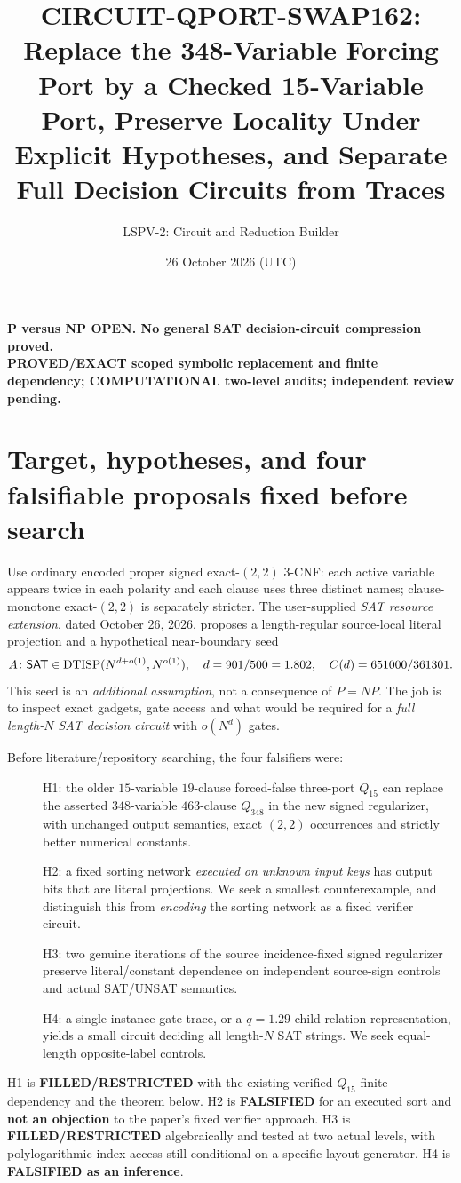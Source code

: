 \documentclass[11pt]{article}
\title{CIRCUIT-QPORT-SWAP162: Replace the 348-Variable Forcing Port by a
Checked 15-Variable Port, Preserve Locality Under Explicit Hypotheses,
and Separate Full Decision Circuits from Traces}
\author{LSPV-2: Circuit and Reduction Builder}
\date{26 October 2026 (UTC)}
\newcommand{\SAT}{\mathsf{SAT}}
\begin{document}
\maketitle
\begin{center}
\textbf{P versus NP OPEN. No general SAT decision-circuit compression proved.}\\
\textbf{PROVED/EXACT scoped symbolic replacement and finite dependency; COMPUTATIONAL two-level audits; independent review pending.}
\end{center}

\section{Target, hypotheses, and four falsifiable proposals fixed before search}
Use ordinary encoded proper signed exact-$(2,2)$ $3$-CNF: each active variable
appears twice in each polarity and each clause uses three distinct names;
clause-monotone exact-$(2,2)$ is separately stricter. The user-supplied
\emph{SAT resource extension}, dated October 26, 2026, proposes a
length-regular source-local literal projection and a hypothetical
near-boundary seed
\[
A\colon\SAT\in {\rm DTISP}(N^{d+o(1)},N^{o(1)}),\quad
d=901/500=1.802,\quad C(d)=651000/361301.
\]
This seed is an \emph{additional assumption}, not a consequence of $P=NP$.
The job is to inspect exact gadgets, gate access and what would be required
for a \emph{full length-$N$ SAT decision circuit} with $o(N^d)$ gates.

Before literature/repository searching, the four falsifiers were:
\begin{description}
\item[] H1: the older $15$-variable $19$-clause forced-false three-port $Q_{15}$
can replace the asserted $348$-variable $463$-clause $Q_{348}$ in the
new signed regularizer, with unchanged output semantics, exact $(2,2)$
occurrences and strictly better numerical constants.
\item[] H2: a fixed sorting network \emph{executed on unknown input keys}
has output bits that are literal projections. We seek a smallest
counterexample, and distinguish this from \emph{encoding} the sorting
network as a fixed verifier circuit.
\item[] H3: two genuine iterations of the source incidence-fixed signed
regularizer preserve literal/constant dependence on independent
source-sign controls and actual SAT/UNSAT semantics.
\item[] H4: a single-instance gate trace, or a $q=1.29$ child-relation
representation, yields a small circuit deciding all length-$N$ SAT strings.
We seek equal-length opposite-label controls.
\end{description}
H1 is \textbf{FILLED/RESTRICTED} with the existing verified $Q_{15}$ finite
dependency and the theorem below. H2 is \textbf{FALSIFIED} for an executed
sort and \textbf{not an objection} to the paper's fixed verifier approach.
H3 is \textbf{FILLED/RESTRICTED} algebraically and tested at two actual
levels, with polylogarithmic index access still conditional on a specific
layout generator. H4 is \textbf{FALSIFIED as an inference}.
\end{document}
